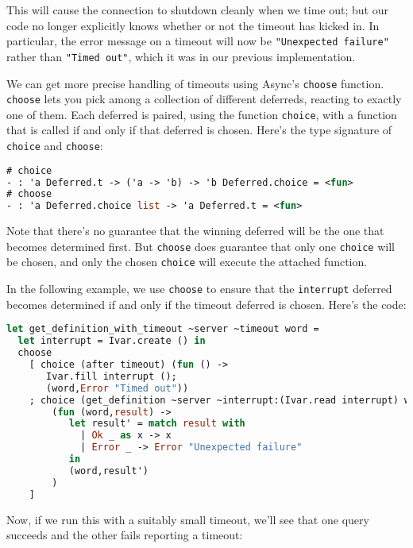This will cause the connection to shutdown cleanly when we time out; but
our code no longer explicitly knows whether or not the timeout has
kicked in. In particular, the error message on a timeout will now be
\passthrough{\lstinline!"Unexpected failure"!} rather than
\passthrough{\lstinline!"Timed out"!}, which it was in our previous
implementation.

We can get more precise handling of timeouts using Async's
\passthrough{\lstinline!choose!} function.
\passthrough{\lstinline!choose!} lets you pick among a collection of
different deferreds, reacting to exactly one of them. Each deferred is
paired, using the function \passthrough{\lstinline!choice!}, with a
function that is called if and only if that deferred is chosen. Here's
the type signature of \passthrough{\lstinline!choice!} and
\passthrough{\lstinline!choose!}:

\begin{lstlisting}[language=Caml]
# choice
- : 'a Deferred.t -> ('a -> 'b) -> 'b Deferred.choice = <fun>
# choose
- : 'a Deferred.choice list -> 'a Deferred.t = <fun>
\end{lstlisting}

Note that there's no guarantee that the winning deferred will be the one
that becomes determined first. But \passthrough{\lstinline!choose!} does
guarantee that only one \passthrough{\lstinline!choice!} will be chosen,
and only the chosen \passthrough{\lstinline!choice!} will execute the
attached function.

In the following example, we use \passthrough{\lstinline!choose!} to
ensure that the \passthrough{\lstinline!interrupt!} deferred becomes
determined if and only if the timeout deferred is chosen. Here's the
code:

\begin{lstlisting}[language=Caml]
let get_definition_with_timeout ~server ~timeout word =
  let interrupt = Ivar.create () in
  choose
    [ choice (after timeout) (fun () ->
       Ivar.fill interrupt ();
       (word,Error "Timed out"))
    ; choice (get_definition ~server ~interrupt:(Ivar.read interrupt) word)
        (fun (word,result) ->
           let result' = match result with
             | Ok _ as x -> x
             | Error _ -> Error "Unexpected failure"
           in
           (word,result')
        )
    ]
\end{lstlisting}

Now, if we run this with a suitably small timeout, we'll see that one
query succeeds and the other fails reporting a timeout:

